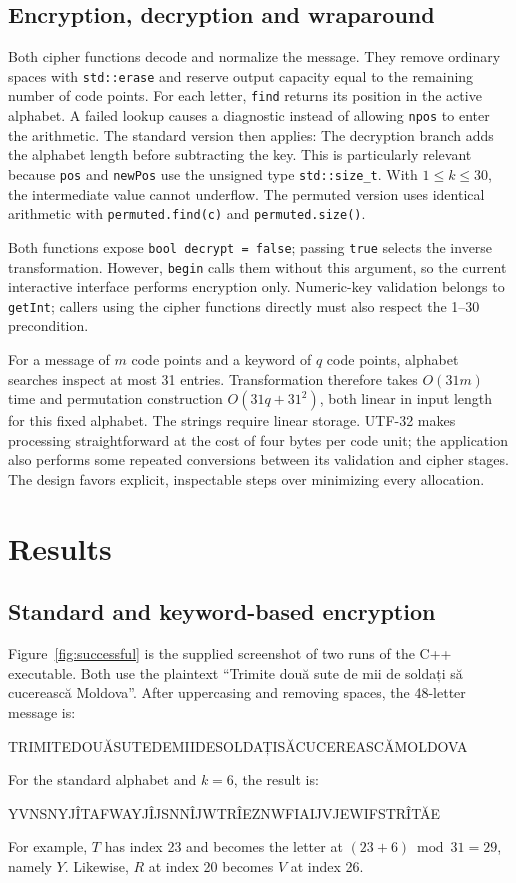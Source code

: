 \documentclass{utmreport}
\newcommand{\sourceexcerpt}[2]{\VerbatimInput[firstline=#1,lastline=#2]{../src/main.cpp}}
\begin{document}
\section{Encryption, decryption and wraparound}
Both cipher functions decode and normalize the message. They remove ordinary spaces with \texttt{std::erase} and reserve output capacity equal to the remaining number of code points. For each letter, \texttt{find} returns its position in the active alphabet. A failed lookup causes a diagnostic instead of allowing \texttt{npos} to enter the arithmetic. The standard version then applies:
\sourceexcerpt{305}{322}
The decryption branch adds the alphabet length before subtracting the key. This is particularly relevant because \texttt{pos} and \texttt{newPos} use the unsigned type \texttt{std::size\_t}. With $1\le k\le30$, the intermediate value cannot underflow. The permuted version uses identical arithmetic with \texttt{permuted.find(c)} and \texttt{permuted.size()}.

Both functions expose \texttt{bool decrypt = false}; passing \texttt{true} selects the inverse transformation. However, \texttt{begin} calls them without this argument, so the current interactive interface performs encryption only. Numeric-key validation belongs to \texttt{getInt}; callers using the cipher functions directly must also respect the 1--30 precondition.

For a message of $m$ code points and a keyword of $q$ code points, alphabet searches inspect at most 31 entries. Transformation therefore takes $O(31m)$ time and permutation construction $O(31q+31^2)$, both linear in input length for this fixed alphabet. The strings require linear storage. UTF-32 makes processing straightforward at the cost of four bytes per code unit; the application also performs some repeated conversions between its validation and cipher stages. The design favors explicit, inspectable steps over minimizing every allocation.

\chapter{Results}
\section{Standard and keyword-based encryption}
Figure~\ref{fig:successful} is the supplied screenshot of two runs of the C++ executable. Both use the plaintext ``Trimite două sute de mii de soldați să cucerească Moldova''. After uppercasing and removing spaces, the 48-letter message is:
\begin{console}
TRIMITEDOUĂSUTEDEMIIDESOLDAȚISĂCUCEREASCĂMOLDOVA
\end{console}
For the standard alphabet and $k=6$, the result is:
\begin{console}
YVNSNYJÎTAFWAYJÎJSNNÎJWTRÎEZNWFIAIJVJEWIFSTRÎTĂE
\end{console}
For example, $T$ has index 23 and becomes the letter at $(23+6)\bmod31=29$, namely $Y$. Likewise, $R$ at index 20 becomes $V$ at index 26.
\end{document}
